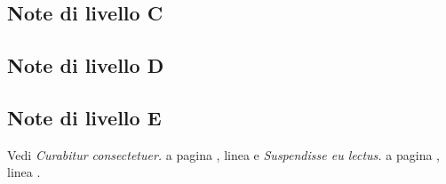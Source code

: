 \documentclass[10pt]{article}
\begin{document}
\subsection{Note di livello C}

\subsection{Note di livello D}

\subsection{Note di livello E}

\clearpage
Vedi \emph{Curabitur consectetuer.} a pagina , linea  e \emph{Suspendisse eu lectus.} a pagina , linea .

\clearpage
\end{document}
